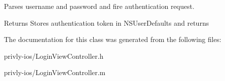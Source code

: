 Parses username and password and fire authentication request. 

\begin{DoxyReturn}{Returns}
Stores authentication token in N\-S\-User\-Defaults and returns 
\end{DoxyReturn}


The documentation for this class was generated from the following files\-:\begin{DoxyCompactItemize}
\item 
privly-\/ios/Login\-View\-Controller.\-h\item 
privly-\/ios/Login\-View\-Controller.\-m\end{DoxyCompactItemize}
